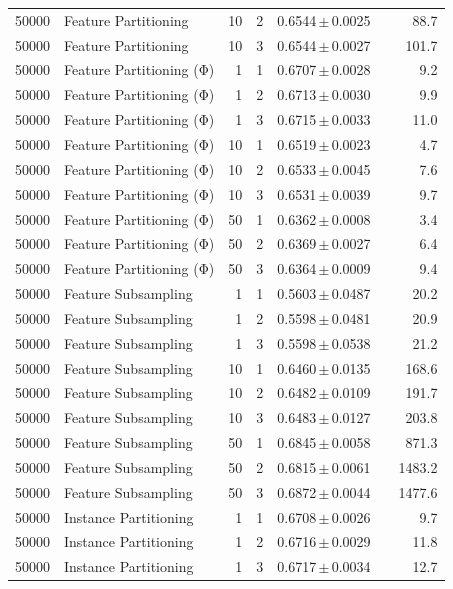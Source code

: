 \begin{table}[ht]
\begin{tabular}{rlrrccr}
50000 & Feature Partitioning & 10 & 2 & 0.6544\,$\pm$\,0.0025 &  & 88.7 \\
50000 & Feature Partitioning & 10 & 3 & 0.6544\,$\pm$\,0.0027 &  & 101.7 \\
50000 & Feature Partitioning (Φ) & 1 & 1 & 0.6707\,$\pm$\,0.0028 &  & 9.2 \\
50000 & Feature Partitioning (Φ) & 1 & 2 & 0.6713\,$\pm$\,0.0030 &  & 9.9 \\
50000 & Feature Partitioning (Φ) & 1 & 3 & 0.6715\,$\pm$\,0.0033 &  & 11.0 \\
50000 & Feature Partitioning (Φ) & 10 & 1 & 0.6519\,$\pm$\,0.0023 &  & 4.7 \\
50000 & Feature Partitioning (Φ) & 10 & 2 & 0.6533\,$\pm$\,0.0045 &  & 7.6 \\
50000 & Feature Partitioning (Φ) & 10 & 3 & 0.6531\,$\pm$\,0.0039 &  & 9.7 \\
50000 & Feature Partitioning (Φ) & 50 & 1 & 0.6362\,$\pm$\,0.0008 &  & 3.4 \\
50000 & Feature Partitioning (Φ) & 50 & 2 & 0.6369\,$\pm$\,0.0027 &  & 6.4 \\
50000 & Feature Partitioning (Φ) & 50 & 3 & 0.6364\,$\pm$\,0.0009 &  & 9.4 \\
50000 & Feature Subsampling & 1 & 1 & 0.5603\,$\pm$\,0.0487 &  & 20.2 \\
50000 & Feature Subsampling & 1 & 2 & 0.5598\,$\pm$\,0.0481 &  & 20.9 \\
50000 & Feature Subsampling & 1 & 3 & 0.5598\,$\pm$\,0.0538 &  & 21.2 \\
50000 & Feature Subsampling & 10 & 1 & 0.6460\,$\pm$\,0.0135 &  & 168.6 \\
50000 & Feature Subsampling & 10 & 2 & 0.6482\,$\pm$\,0.0109 &  & 191.7 \\
50000 & Feature Subsampling & 10 & 3 & 0.6483\,$\pm$\,0.0127 &  & 203.8 \\
50000 & Feature Subsampling & 50 & 1 & 0.6845\,$\pm$\,0.0058 &  & 871.3 \\
50000 & Feature Subsampling & 50 & 2 & 0.6815\,$\pm$\,0.0061 &  & 1483.2 \\
50000 & Feature Subsampling & 50 & 3 & 0.6872\,$\pm$\,0.0044 &  & 1477.6 \\
50000 & Instance Partitioning & 1 & 1 & 0.6708\,$\pm$\,0.0026 &  & 9.7 \\
50000 & Instance Partitioning & 1 & 2 & 0.6716\,$\pm$\,0.0029 &  & 11.8 \\
50000 & Instance Partitioning & 1 & 3 & 0.6717\,$\pm$\,0.0034 &  & 12.7 \\

\end{tabular}
\end{table}
